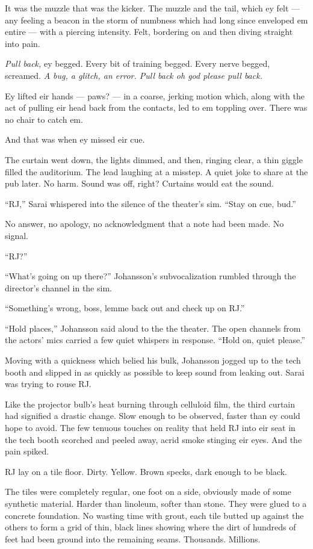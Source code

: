 It was the muzzle that was the kicker. The muzzle and the tail, which ey felt --- any feeling a beacon in the storm of numbness which had long since enveloped em entire --- with a piercing intensity. Felt, bordering on and then diving straight into pain.

\emph{Pull back,} ey begged. Every bit of training begged. Every nerve begged, screamed. \emph{A bug, a glitch, an error. Pull back oh god please pull back.}

Ey lifted eir hands --- paws? --- in a coarse, jerking motion which, along with the act of pulling eir head back from the contacts, led to em toppling over. There was no chair to catch em.

And that was when ey missed eir cue.

The curtain went down, the lights dimmed, and then, ringing clear, a thin giggle filled the auditorium. The lead laughing at a misstep. A quiet joke to share at the pub later. No harm. Sound was off, right? Curtains would eat the sound.

``RJ,'' Sarai whispered into the silence of the theater's sim. ``Stay on cue, bud.''

No answer, no apology, no acknowledgment that a note had been made. No signal.

``RJ?''

``What's going on up there?'' Johansson's subvocalization rumbled through the director's channel in the sim.

``Something's wrong, boss, lemme back out and check up on RJ.''

``Hold places,'' Johansson said aloud to the the theater. The open channels from the actors' mics carried a few quiet whispers in response. ``Hold on, quiet please.''

Moving with a quickness which belied his bulk, Johansson jogged up to the tech booth and slipped in as quickly as possible to keep sound from leaking out. Sarai was trying to rouse RJ.

Like the projector bulb's heat burning through celluloid film, the third curtain had signified a drastic change. Slow enough to be observed, faster than ey could hope to avoid. The few tenuous touches on reality that held RJ into eir seat in the tech booth scorched and peeled away, acrid smoke stinging eir eyes. And the pain spiked.

RJ lay on a tile floor. Dirty. Yellow. Brown specks, dark enough to be black.

The tiles were completely regular, one foot on a side, obviously made of some synthetic material. Harder than linoleum, softer than stone. They were glued to a concrete foundation. No wasting time with grout, each tile butted up against the others to form a grid of thin, black lines showing where the dirt of hundreds of feet had been ground into the remaining seams. Thousands. Millions.


